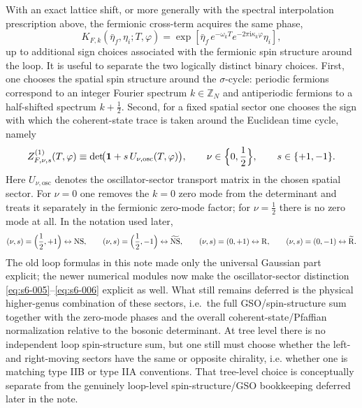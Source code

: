 \documentclass[11pt]{article}
\numberwithin{equation}{section}
\newcommand{\ZZ}{\mathbb{Z}}
\newcommand{\ii}{\mathrm{i}}
\begin{document}
With an exact lattice shift, or more generally with the spectral interpolation prescription above, the fermionic cross-term acquires the same phase,
\begin{equation}
\label{eq:s6-004}
K_{F,k}(\bar\eta_f,\eta_i;T,\varphi)=
\exp\!\left[\bar\eta_f\,e^{-\omega_k T}e^{-2\pi \ii \kappa_k\varphi}\eta_i\right],
\end{equation}
up to additional sign choices associated with the fermionic spin structure around the loop. It is useful to separate the two logically distinct binary choices. First, one chooses the spatial spin structure around the $\sigma$-cycle: periodic fermions correspond to an integer Fourier spectrum $k\in\ZZ_N$ and antiperiodic fermions to a half-shifted spectrum $k+\tfrac12$. Second, for a fixed spatial sector one chooses the sign with which the coherent-state trace is taken around the Euclidean time cycle, namely
\begin{equation}
\label{eq:s6-005}
Z^{(1)}_{F,\nu,s}(T,\varphi)
\equiv
\det\!\bigl(\mathbf{1}+s\,U_{\nu,\mathrm{osc}}(T,\varphi)\bigr),
\qquad
\nu\in\Bigl\{0,\frac12\Bigr\},
\qquad
s\in\{+1,-1\}.
\end{equation}
Here $U_{\nu,\mathrm{osc}}$ denotes the oscillator-sector transport matrix in the chosen spatial sector. For $\nu=0$ one removes the $k=0$ zero mode from the determinant and treats it separately in the fermionic zero-mode factor; for $\nu=\frac12$ there is no zero mode at all. In the notation used later,
\begin{equation}
\label{eq:s6-006}
(\nu,s)=\Bigl(\frac12,+1\Bigr)\leftrightarrow \mathrm{NS},\qquad
(\nu,s)=\Bigl(\frac12,-1\Bigr)\leftrightarrow \widetilde{\mathrm{NS}},\qquad
(\nu,s)=(0,+1)\leftrightarrow \mathrm{R},\qquad
(\nu,s)=(0,-1)\leftrightarrow \widetilde{\mathrm{R}}.
\end{equation}
The old loop formulas in this note made only the universal Gaussian part explicit; the newer numerical modules now make the oscillator-sector distinction \eqref{eq:s6-005}--\eqref{eq:s6-006} explicit as well. What still remains deferred is the physical higher-genus combination of these sectors, i.e.\ the full GSO/spin-structure sum together with the zero-mode phases and the overall coherent-state/Pfaffian normalization relative to the bosonic determinant.
At tree level there is no independent loop spin-structure sum, but one still must choose whether the left- and right-moving sectors have the same or opposite chirality, i.e. whether one is matching type IIB or type IIA conventions. That tree-level choice is conceptually separate from the genuinely loop-level spin-structure/GSO bookkeeping deferred later in the note.
\end{document}
